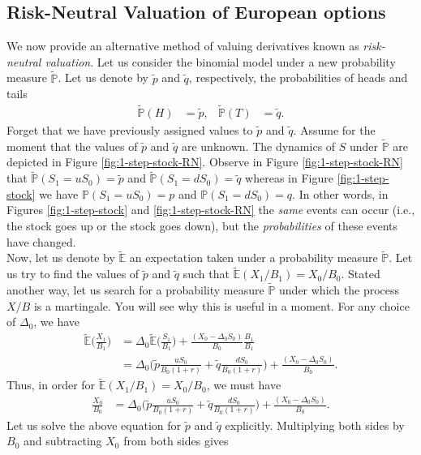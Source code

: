 \documentclass[12pt]{book}
\numberwithin{equation}{chapter}
\theoremstyle{plain}
\numberwithin{theorem}{section}
\theoremstyle{definition}
\numberwithin{exercise}{chapter}
\newcommand{\<}{\langle}
\renewcommand{\>}{\rangle}
\renewcommand{\(}{\left(}
\renewcommand{\)}{\right)}
\renewcommand{\[}{\left[}
\renewcommand{\]}{\right]}
\newcommand\Eb{\mathds{E}}
\newcommand\Pb{\mathds{P}}
\newcommand\Del{\Delta}
\newcommand\Ebt{\widetilde{\Eb}}
\newcommand\Pbt{\widetilde{\Pb}}
\newcommand\qt{\widetilde{q}}
\theoremstyle{definition}
\numberwithin{question}{section}
\newcommand\pt{\widetilde{p}}
\begin{document}
\subsection{Risk-Neutral Valuation of European options }
We now provide an alternative method of valuing derivatives known as \textit{risk-neutral valuation}.
Let us consider the binomial model under a new probability measure $\Pbt$.
Let us denote by $\pt$ and $\qt$, respectively, the probabilities of heads and tails
\begin{align}
\Pbt(H)
	&=	\pt , &
\Pbt(T)
	&=	\qt .
\end{align}
Forget that we have previously assigned values to $\pt$ and $\qt$.  Assume for the moment that the values of $\pt$ and $\qt$ are unknown.
The dynamics of $S$ under $\Pbt$ are depicted in Figure \ref{fig:1-step-stock-RN}.
Observe in Figure \ref{fig:1-step-stock-RN} that $\Pbt(S_1 = u S_0) = \pt$ and $\Pbt( S_1 = d S_0) = \qt$ whereas in Figure \ref{fig:1-step-stock} we have $\Pb( S_1 = u S_0) = p$ and $\Pb( S_1 = d S_0) = q$.  In other words, in Figures \ref{fig:1-step-stock} and \ref{fig:1-step-stock-RN} the \textit{same} events can occur (i.e., the stock goes up or the stock goes down), but the \textit{probabilities} of these events have changed.
\\[0.5em]
Now, let us denote by $\Ebt$ an expectation taken under a probability measure $\Pbt$.  
Let us try to find the values of $\pt$ and $\qt$ such that $\Ebt(X_1/B_1) = X_0/B_0$.
Stated another way, let us search for a probability measure $\Pbt$ under which the process $X/B$ is a martingale.
You will see why this is useful in a moment.
For any choice of $\Del_0$, we have
\begin{align}
\Ebt \Big( \frac{X_1}{B_1} \Big)
	&=	\Del_0 \Ebt \Big( \frac{S_1}{B_1} \Big) + \frac{(X_0 - \Del_0 S_0)}{B_0} \frac{B_1}{B_1} \\
	&=	\Del_0 \Big( \pt \frac{u S_0}{B_0 (1+r)} + \qt \frac{dS_0}{B_0 (1+r)} \Big) + \frac{(X_0 - \Del_0 S_0)}{B_0}  .
\end{align}
Thus, in order for $\Ebt(X_1/B_1) = X_0/B_0$, we must have
\begin{align}
\frac{X_0}{B_0}
	&=	\Del_0 \Big( \pt \frac{u S_0}{B_0 (1+r)} + \qt \frac{dS_0}{B_0 (1+r)} \Big) + \frac{(X_0 - \Del_0 S_0)}{B_0} .
\end{align}
Let us solve the above equation for $\pt$ and $\qt$ explicitly.  Multiplying both sides by $B_0$ and subtracting $X_0$ from both sides gives
\end{document}
